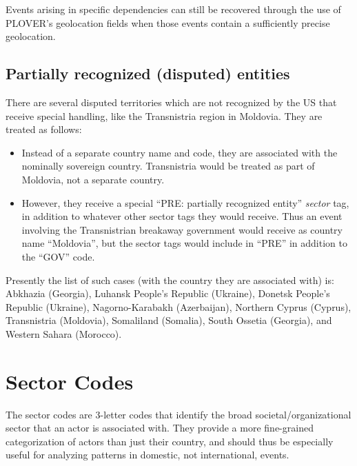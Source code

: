 \documentclass[11pt]{report}
\begin{document}
Events arising in specific dependencies can still be recovered through the use of PLOVER's geolocation fields when those events contain a sufficiently precise geolocation.

\subsection{Partially recognized (disputed) entities}\label{partially-recognized-entities}

There are several disputed territories which are not recognized by the US that receive special handling, like the Transnistria region in Moldovia. They are treated as follows:

\begin{itemize}
\item Instead of a separate country name and code, they are associated with the nominally sovereign country. Transnistria would be treated as part of Moldovia, not a separate country.
\item However, they receive a special ``PRE: partially recognized entity'' \textit{sector} tag, in addition to whatever other sector tags they would receive. Thus an event involving the Transnistrian breakaway government would receive as country name ``Moldovia'', but the sector tags would include in ``PRE'' in addition to the ``GOV'' code.
\end{itemize}

Presently the list of such cases (with the country they are associated with) is: Abkhazia (Georgia), Luhansk People's Republic (Ukraine), Donetsk People's Republic (Ukraine), Nagorno-Karabakh (Azerbaijan), Northern Cyprus (Cyprus), Transnistria (Moldovia), Somaliland (Somalia), South Ossetia (Georgia), and Western Sahara (Morocco).


\clearpage
\newpage

\section{Sector Codes}

The sector codes are 3-letter codes that identify the broad societal/organizational sector that an actor is associated with. They provide a more fine-grained categorization of actors than just their country, and should thus be especially useful for analyzing patterns in domestic, not international, events.
\end{document}

